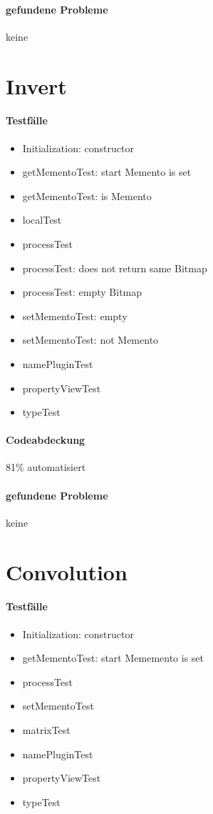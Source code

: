 \paragraph*{gefundene Probleme}
keine

\section{Invert}
\paragraph*{Testfälle}
\begin{itemize}
\item Initialization: constructor
\item getMementoTest: start Memento is set
\item getMementoTest: is Memento
\item localTest
\item processTest
\item processTest: does not return same Bitmap
\item processTest: empty Bitmap
\item setMementoTest: empty
\item setMementoTest: not Memento
\item namePluginTest
\item propertyViewTest
\item typeTest
\end{itemize}

\paragraph*{Codeabdeckung}
81\% automatisiert

\paragraph*{gefundene Probleme}
keine

\section{Convolution}
\paragraph*{Testfälle}
\begin{itemize}
\item Initialization: constructor
\item getMementoTest: start Mememento is set
\item processTest
\item setMementoTest
\item matrixTest
\item namePluginTest
\item propertyViewTest
\item typeTest
\end{itemize}

